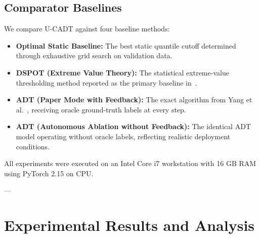 \documentclass[conference]{IEEEtran}
\begin{document}
\subsection{Comparator Baselines}
We compare U-CADT against four baseline methods:
\begin{itemize}
    \item \textbf{Optimal Static Baseline:} The best static quantile cutoff determined through exhaustive grid search on validation data.
    \item \textbf{DSPOT (Extreme Value Theory):} The statistical extreme-value thresholding method reported as the primary baseline in~\cite{yang2023adt}.
    \item \textbf{ADT (Paper Mode with Feedback):} The exact algorithm from Yang et al.~\cite{yang2023adt}, receiving oracle ground-truth labels at every step.
    \item \textbf{ADT (Autonomous Ablation without Feedback):} The identical ADT model operating without oracle labels, reflecting realistic deployment conditions.
\end{itemize}

All experiments were executed on an Intel Core i7 workstation with 16 GB RAM using PyTorch 2.15 on CPU.

---

\section{Experimental Results and Analysis}
\end{document}
